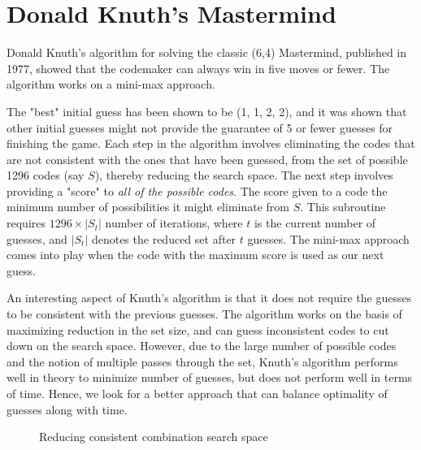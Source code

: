 \documentclass[]{article}
\begin{document}
	\section{Donald Knuth's Mastermind}
		Donald Knuth's algorithm for solving the classic (6,4) Mastermind, published in 1977, showed that the codemaker can always win in five moves or fewer. The algorithm works on a mini-max approach.
		
		The "best" initial guess has been shown to be (1, 1, 2, 2), and it was shown that other initial guesses might not provide the guarantee of 5 or fewer guesses for finishing the game. Each step in the algorithm involves eliminating the codes that are not consistent with the ones that have been guessed, from the set of possible 1296 codes (say $S$), thereby reducing the search space.
		The next step involves providing a "score" to \textit{all of the possible codes}. The score given to a code the minimum number of possibilities it might eliminate from $S$. This subroutine requires $1296 \times |S_t|$ number of iterations, where $t$ is the current number of guesses, and $|S_t|$ denotes the reduced set after $t$ guesses. The mini-max approach comes into play when the code with the maximum score is used as our next guess.	
		
		An interesting aspect of Knuth's algorithm is that it does not require the guesses to be consistent with the previous guesses. The algorithm works on the basis of maximizing reduction in the set size, and can guess inconsistent codes to cut down on the search space. However, due to the large number of possible codes and the notion of multiple passes through the set, Knuth's algorithm performs well in theory to minimize number of guesses, but does not perform well in terms of time. Hence, we look for a better approach that can balance optimality of guesses along with time.

\begin{figure}[H]
		\centering
		\caption{Reducing consistent combination search space}
\end{figure}
\end{document}
